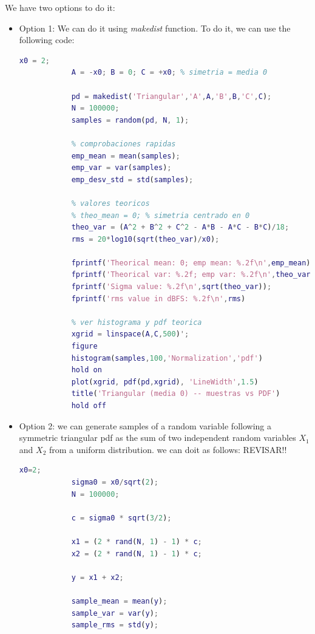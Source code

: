 \documentclass[11pt,a4paper]{article}
\begin{document}
\vspace{0.5cm}
We have two options to do it:
\begin{itemize}
    \item Option 1: We can do it using \textit{makedist} function. To do it, we can use the following code:
          \begin{lstlisting}[language=Matlab]
            x0 = 2;
            A = -x0; B = 0; C = +x0; % simetria = media 0

            pd = makedist('Triangular','A',A,'B',B,'C',C);
            N = 100000;
            samples = random(pd, N, 1);

            % comprobaciones rapidas
            emp_mean = mean(samples);
            emp_var = var(samples);
            emp_desv_std = std(samples);

            % valores teoricos
            % theo_mean = 0; % simetria centrado en 0
            theo_var = (A^2 + B^2 + C^2 - A*B - A*C - B*C)/18;
            rms = 20*log10(sqrt(theo_var)/x0);

            fprintf('Theorical mean: 0; emp mean: %.2f\n',emp_mean);
            fprintf('Theorical var: %.2f; emp var: %.2f\n',theo_var,emp_var);
            fprintf('Sigma value: %.2f\n',sqrt(theo_var));
            fprintf('rms value in dBFS: %.2f\n',rms)

            % ver histograma y pdf teorica
            xgrid = linspace(A,C,500)';
            figure
            histogram(samples,100,'Normalization','pdf')
            hold on
            plot(xgrid, pdf(pd,xgrid), 'LineWidth',1.5)
            title('Triangular (media 0) -- muestras vs PDF')
            hold off
        \end{lstlisting}
    \item Option 2: we can generate samples of a random variable following a symmetric triangular pdf as the sum of two independent
          random variables $X_1$ and $X_2$  from a uniform distribution.
          we can doit as follows: REVISAR!!
          \begin{lstlisting}[language=Matlab]
            x0=2;
            sigma0 = x0/sqrt(2);
            N = 100000;
            
            c = sigma0 * sqrt(3/2);

            x1 = (2 * rand(N, 1) - 1) * c;
            x2 = (2 * rand(N, 1) - 1) * c;

            y = x1 + x2;

            sample_mean = mean(y);
            sample_var = var(y);
            sample_rms = std(y);


\end{lstlisting}
\end{itemize}
\end{document}
